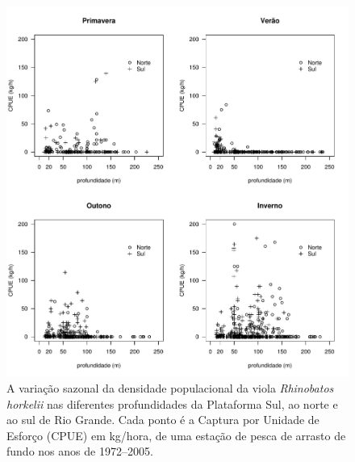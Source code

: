\documentclass[a4paper,11pt,twoside,showtrims,onecolumn,openright,final]{memoir}
\begin{document}
\begin{figure}
\begin{center}
\includegraphics[width=\textwidth]{VIOLA_CPUEXPROFTRIMESTRES}
\end{center}
\caption[Variação sazonal da densidade populacional da viola \emph{Rhinobatos horkelii}]
	{A variação sazonal da densidade populacional da viola \emph{Rhinobatos horkelii} 
	 nas diferentes profundidades da Plataforma Sul, ao norte e ao sul de Rio Grande. 
	 Cada ponto é a Captura por Unidade de Esforço (CPUE) em kg/hora, de uma 
	 estação de pesca de arrasto de fundo nos anos de  1972--2005.}
\label{fig:viola-cpueportrimestre}
\end{figure}


%
%
\end{document}
